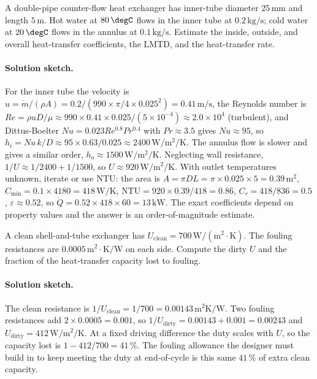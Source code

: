 \begin{exercise}
A double-pipe counter-flow heat exchanger has inner-tube diameter
$25\,\si{\milli\meter}$ and length $5\,\text{m}$. Hot water at $80\,
\degC$ flows in the inner tube at $0.2\,\text{kg/s}$; cold water at
$20\,\degC$ flows in the annulus at $0.1\,\text{kg/s}$. Estimate the
inside, outside, and overall heat-transfer coefficients, the LMTD,
and the heat-transfer rate.

\paragraph{Solution sketch.} For the inner tube the velocity is $u =
\dot{m}/(\rho A) = 0.2/(990 \times \pi/4 \times 0.025^2) = 0.41\,
\text{m/s}$, the Reynolds number is $Re = \rho u D/\mu \approx 990
\times 0.41 \times 0.025/(5 \times 10^{-4}) \approx 2.0 \times 10^4$
(turbulent), and Dittus-Boelter $Nu = 0.023 Re^{0.8} Pr^{0.4}$ with
$Pr \approx 3.5$ gives $Nu \approx 95$, so $h_i = Nu\,k/D \approx 95
\times 0.63/0.025 \approx 2400\,\si{\watt\per\meter\squared\per
\kelvin}$. The annulus flow is slower and gives a similar
order, $h_o \approx 1500\,\si{\watt\per\meter\squared\per\kelvin}$.
Neglecting wall resistance, $1/U \approx 1/2400 + 1/1500$, so $U
\approx 920\,\si{\watt\per\meter\squared\per\kelvin}$. With outlet
temperatures unknown, iterate or use NTU: the area is $A = \pi D L =
\pi \times 0.025 \times 5 = 0.39\,\text{m}^2$, $C_{\min} = 0.1 \times
4180 = 418\,\si{\watt\per\kelvin}$, $\text{NTU} = 920 \times 0.39/418 =
0.86$, $C_r = 418/836 = 0.5$, $\varepsilon \approx 0.52$, so $\dot{Q} =
0.52 \times 418 \times 60 = 13\,\text{kW}$. The exact coefficients
depend on property values and the answer is an order-of-magnitude
estimate.
\end{exercise}

\begin{exercise}
A clean shell-and-tube exchanger has $U_{\text{clean}} = 700\,\text{W}/
(\text{m}^2\cdot\si{\kelvin})$. The fouling resistances are
$0.0005\,\text{m}^2\cdot\si{\kelvin}/\text{W}$ on each side. Compute
the dirty $U$ and the fraction of the heat-transfer capacity lost
to fouling.

\paragraph{Solution sketch.} The clean resistance is $1/U_{\text{clean}} =
1/700 = 0.00143\,\text{m}^2\si{\kelvin}/\text{W}$. Two fouling
resistances add $2 \times 0.0005 = 0.001$, so $1/U_{\text{dirty}} =
0.00143 + 0.001 = 0.00243$ and $U_{\text{dirty}} = 412\,\si{\watt\per
\meter\squared\per\kelvin}$. At a fixed driving difference the duty
scales with $U$, so the capacity lost is $1 - 412/700 = 41\,\%$. The
fouling allowance the designer must build in to keep meeting the duty
at end-of-cycle is this same $41\,\%$ of extra clean capacity.
\end{exercise}

